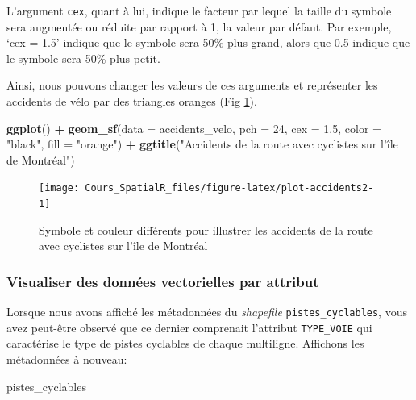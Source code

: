 \documentclass[
  12pt,
]{krantz}
\newenvironment{Shaded}{\begin{snugshade}}{\end{snugshade}}
\newcommand{\DataTypeTok}[1]{\textcolor[rgb]{0.13,0.29,0.53}{#1}}
\newcommand{\DecValTok}[1]{\textcolor[rgb]{0.00,0.00,0.81}{#1}}
\newcommand{\FloatTok}[1]{\textcolor[rgb]{0.00,0.00,0.81}{#1}}
\newcommand{\KeywordTok}[1]{\textcolor[rgb]{0.13,0.29,0.53}{\textbf{#1}}}
\newcommand{\NormalTok}[1]{#1}
\newcommand{\OperatorTok}[1]{\textcolor[rgb]{0.81,0.36,0.00}{\textbf{#1}}}
\newcommand{\StringTok}[1]{\textcolor[rgb]{0.31,0.60,0.02}{#1}}
\begin{document}
L'argument \texttt{cex}, quant à lui, indique le facteur par lequel la taille du symbole sera augmentée ou réduite par rapport à 1, la valeur par défaut. Par exemple, `cex = 1.5' indique que le symbole sera 50\% plus grand, alors que 0.5 indique que le symbole sera 50\% plus petit.

Ainsi, nous pouvons changer les valeurs de ces arguments et représenter les accidents de vélo par des triangles oranges (Fig \ref{fig:plot-accidents2}).

\begin{Shaded}
\begin{Highlighting}[]
\KeywordTok{ggplot}\NormalTok{() }\OperatorTok{+}
\KeywordTok{geom_sf}\NormalTok{(}\DataTypeTok{data =}\NormalTok{ accidents_velo, }\DataTypeTok{pch =} \DecValTok{24}\NormalTok{, }\DataTypeTok{cex =} \FloatTok{1.5}\NormalTok{, }\DataTypeTok{color =} \StringTok{"black"}\NormalTok{, }\DataTypeTok{fill =} \StringTok{"orange"}\NormalTok{) }\OperatorTok{+}
\KeywordTok{ggtitle}\NormalTok{(}\StringTok{"Accidents de la route avec cyclistes sur l'île de Montréal"}\NormalTok{)}
\end{Highlighting}
\end{Shaded}

\begin{figure}

{\centering \texttt{[image: Cours\_SpatialR\_files/figure-latex/plot-accidents2-1]} 

}

\caption{Symbole et couleur différents pour illustrer les accidents de la route avec cyclistes sur l'île de Montréal}\label{fig:plot-accidents2}
\end{figure}

\hypertarget{visualiser-des-donnuxe9es-vectorielles-par-attribut}{%
\subsubsection*{Visualiser des données vectorielles par attribut}\label{visualiser-des-donnuxe9es-vectorielles-par-attribut}}


Lorsque nous avons affiché les métadonnées du \emph{shapefile} \texttt{pistes\_cyclables}, vous avez peut-être observé que ce dernier comprenait l'attribut \texttt{TYPE\_VOIE} qui caractérise le type de pistes cyclables de chaque multiligne. Affichons les métadonnées à nouveau:

\begin{Shaded}
\begin{Highlighting}[]
\NormalTok{pistes_cyclables}
\end{Highlighting}
\end{Shaded}
\end{document}
